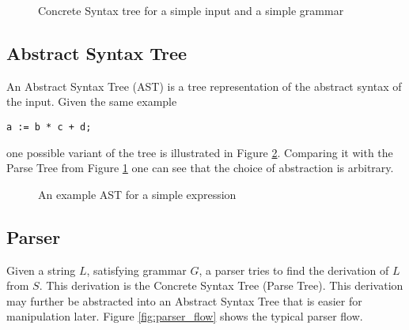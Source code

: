 \begin{figure}[hbt!]
  \centering
  \caption{Concrete Syntax tree for a simple input and a simple grammar}
  \label{fig:simple_cst}
\end{figure}

\subsection{Abstract Syntax Tree}

An Abstract Syntax Tree (AST) is a tree representation of the abstract
syntax of the input. Given the same example
\begin{lstlisting}
a := b * c + d;
\end{lstlisting}
one possible variant of the tree is illustrated in Figure
\ref{fig:simple_ast}. Comparing it with the Parse Tree from Figure
\ref{fig:simple_cst} one can see that the choice of abstraction is
arbitrary.

\begin{figure}[hbt!]
  \centering
  \caption{An example AST for a simple expression}
  \label{fig:simple_ast}
\end{figure}

\subsection{Parser}

Given a string $L$, satisfying grammar $G$, a parser tries to find the
derivation of $L$ from $S$. This derivation is the Concrete Syntax
Tree (Parse Tree). This derivation may further be abstracted into an
Abstract Syntax Tree that is easier for manipulation later. Figure
\ref{fig:parser_flow} shows the typical parser flow.

